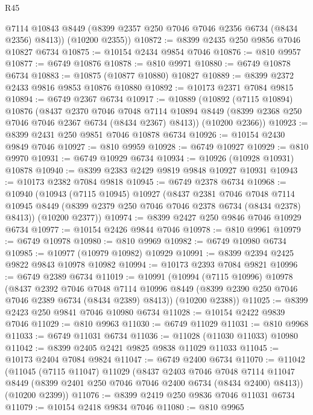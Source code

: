 \begin{lexlean}{R45}
\begin{coremodule}
{        @7114
        @10843
        @8449
        (@8399 @2357 @250 @7046 @7046 @2356 @6734 (@8434 @2356) @8413))
      (@10200 @2355))
@10872 := @8399 @2435 @250 @9856 @7046 @10827 @6734
@10875 := @10154 @2434 @9854 @7046
@10876 := @810 @9957
@10877 := @6749 @10876
@10878 := @810 @9971
@10880 := @6749 @10878 @6734
@10883 := @10875 (@10877 @10880) @10827
@10889 := @8399 @2372 @2433 @9816 @9853 @10876 @10880
@10892 := @10173 @2371 @7084 @9815
@10894 := @6749 @2367 @6734
@10917 := @10889
    (@10892
      (@7115 @10894)
      @10876
      (@8437
        @2370
        @7046
        @7048
        @7114
        @10894
        @8449
        (@8399 @2368 @250 @7046 @7046 @2367 @6734 (@8434 @2367) @8413))
      (@10200 @2366))
@10923 := @8399 @2431 @250 @9851 @7046 @10878 @6734
@10926 := @10154 @2430 @9849 @7046
@10927 := @810 @9959
@10928 := @6749 @10927
@10929 := @810 @9970
@10931 := @6749 @10929 @6734
@10934 := @10926 (@10928 @10931) @10878
@10940 := @8399 @2383 @2429 @9819 @9848 @10927 @10931
@10943 := @10173 @2382 @7084 @9818
@10945 := @6749 @2378 @6734
@10968 := @10940
    (@10943
      (@7115 @10945)
      @10927
      (@8437
        @2381
        @7046
        @7048
        @7114
        @10945
        @8449
        (@8399 @2379 @250 @7046 @7046 @2378 @6734 (@8434 @2378) @8413))
      (@10200 @2377))
@10974 := @8399 @2427 @250 @9846 @7046 @10929 @6734
@10977 := @10154 @2426 @9844 @7046
@10978 := @810 @9961
@10979 := @6749 @10978
@10980 := @810 @9969
@10982 := @6749 @10980 @6734
@10985 := @10977 (@10979 @10982) @10929
@10991 := @8399 @2394 @2425 @9822 @9843 @10978 @10982
@10994 := @10173 @2393 @7084 @9821
@10996 := @6749 @2389 @6734
@11019 := @10991
    (@10994
      (@7115 @10996)
      @10978
      (@8437
        @2392
        @7046
        @7048
        @7114
        @10996
        @8449
        (@8399 @2390 @250 @7046 @7046 @2389 @6734 (@8434 @2389) @8413))
      (@10200 @2388))
@11025 := @8399 @2423 @250 @9841 @7046 @10980 @6734
@11028 := @10154 @2422 @9839 @7046
@11029 := @810 @9963
@11030 := @6749 @11029
@11031 := @810 @9968
@11033 := @6749 @11031 @6734
@11036 := @11028 (@11030 @11033) @10980
@11042 := @8399 @2405 @2421 @9825 @9838 @11029 @11033
@11045 := @10173 @2404 @7084 @9824
@11047 := @6749 @2400 @6734
@11070 := @11042
    (@11045
      (@7115 @11047)
      @11029
      (@8437
        @2403
        @7046
        @7048
        @7114
        @11047
        @8449
        (@8399 @2401 @250 @7046 @7046 @2400 @6734 (@8434 @2400) @8413))
      (@10200 @2399))
@11076 := @8399 @2419 @250 @9836 @7046 @11031 @6734
@11079 := @10154 @2418 @9834 @7046
@11080 := @810 @9965
}
\end{coremodule}
\end{lexlean}
